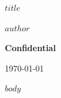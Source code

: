\documentclass[a4paper]{article}
\newcommand{\documentclassification}{Confidential}
\begin{document}
\begin{titlepage}
    \centering
    \vspace*{2cm}
    {\Huge\bfseries $title$\par}
    \vspace{1cm}
    {\Large $author$\par}
    \vspace{1cm}
    {\large \textbf{\documentclassification}\par}
    \vfill
    {\large \today\par}
\end{titlepage}

\tableofcontents
\newpage

$body$
\end{document}
